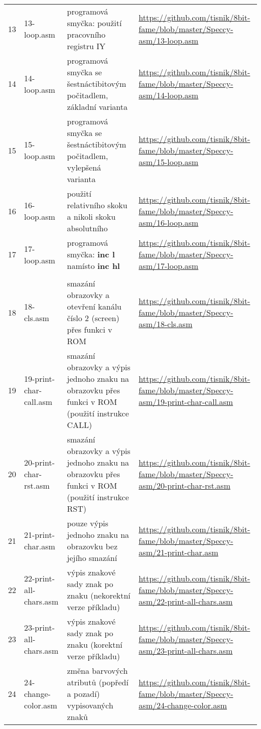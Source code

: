 \documentclass{article}
\begin{document}
\begin{longtable}[]{@{}llll@{}}
13 & 13-loop.asm & programová smyčka: použití pracovního registru IY &
\url{https://github.com/tisnik/8bit-fame/blob/master/Speccy-asm/13-loop.asm} \\
14 & 14-loop.asm & programová smyčka se šestnáctibitovým počitadlem,
základní varianta &
\url{https://github.com/tisnik/8bit-fame/blob/master/Speccy-asm/14-loop.asm} \\
15 & 15-loop.asm & programová smyčka se šestnáctibitovým počitadlem,
vylepšená varianta &
\url{https://github.com/tisnik/8bit-fame/blob/master/Speccy-asm/15-loop.asm} \\
16 & 16-loop.asm & použití relativního skoku a nikoli skoku absolutního
&
\url{https://github.com/tisnik/8bit-fame/blob/master/Speccy-asm/16-loop.asm} \\
17 & 17-loop.asm & programová smyčka: \textbf{inc l} namísto \textbf{inc
hl} &
\url{https://github.com/tisnik/8bit-fame/blob/master/Speccy-asm/17-loop.asm} \\
& & & \\
18 & 18-cls.asm & smazání obrazovky a otevření kanálu číslo 2 (screen)
přes funkci v ROM &
\url{https://github.com/tisnik/8bit-fame/blob/master/Speccy-asm/18-cls.asm} \\
19 & 19-print-char-call.asm & smazání obrazovky a výpis jednoho znaku na
obrazovku přes funkci v ROM (použití instrukce CALL) &
\url{https://github.com/tisnik/8bit-fame/blob/master/Speccy-asm/19-print-char-call.asm} \\
20 & 20-print-char-rst.asm & smazání obrazovky a výpis jednoho znaku na
obrazovku přes funkci v ROM (použití instrukce RST) &
\url{https://github.com/tisnik/8bit-fame/blob/master/Speccy-asm/20-print-char-rst.asm} \\
21 & 21-print-char.asm & pouze výpis jednoho znaku na obrazovku bez
jejího smazání &
\url{https://github.com/tisnik/8bit-fame/blob/master/Speccy-asm/21-print-char.asm} \\
22 & 22-print-all-chars.asm & výpis znakové sady znak po znaku
(nekorektní verze příkladu) &
\url{https://github.com/tisnik/8bit-fame/blob/master/Speccy-asm/22-print-all-chars.asm} \\
23 & 23-print-all-chars.asm & výpis znakové sady znak po znaku (korektní
verze příkladu) &
\url{https://github.com/tisnik/8bit-fame/blob/master/Speccy-asm/23-print-all-chars.asm} \\
24 & 24-change-color.asm & změna barvových atributů (popředí a pozadí)
vypisovaných znaků &
\url{https://github.com/tisnik/8bit-fame/blob/master/Speccy-asm/24-change-color.asm} \\

\end{longtable}
\end{document}
